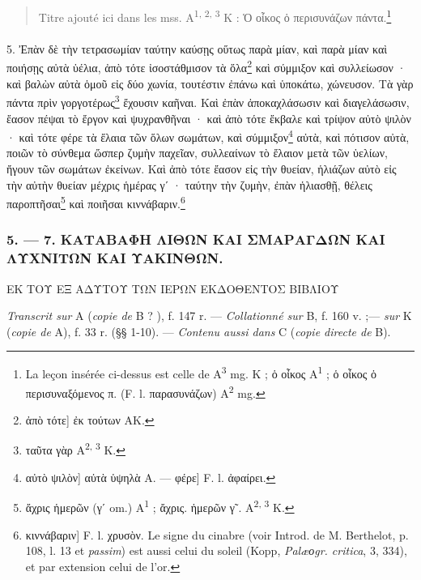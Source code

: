 \documentclass[a4paper, 11pt, oneside, polutonikogreek, french]{article}
\begin{document}
\begin{quotation}
Titre ajouté ici dans les mss. A\textsuperscript{1, 2, 3} K : Ὁ οἶκος ὁ περισυνάζων πάντα.\footnote{La leçon insérée ci-dessus est celle de A\textsuperscript{3} mg. K ; ὁ οἶκος A\textsuperscript{1} ; ὁ οἶκος ὁ περισυναξόμενος π. (F. l. παρασυνάζων) A\textsuperscript{2} mg.}
\end{quotation}
\paragraph{}
5. Ἐπὰν δὲ τὴν τετρασωμίαν ταύτην καύσῃς οὕτως παρὰ μίαν, καὶ παρὰ μίαν καὶ ποιήσῃς αὐτὰ ὑέλια, ἀπὸ τότε ἰσοστάθμισον τὰ ὅλα\footnote{ἀπὸ τότε] ἐκ τούτων AK.} καὶ σύμμιξον καὶ συλλείωσον · καὶ βαλὼν αὐτὰ ὁμοῦ εἰς δύο χωνία, τουτέστιν ἐπάνω καὶ ὑποκάτω, χώνευσον. Τὰ γὰρ πάντα πρὶν γοργοτέρως\footnote{ταῦτα γὰρ A\textsuperscript{2, 3} K.} ἔχουσιν καῆναι. Καὶ ἐπὰν ἀποκαχλάσωσιν καὶ διαγελάσωσιν, ἔασον πέψαι τὸ ἔργον καὶ ψυχρανθῆναι · καὶ ἀπὸ τότε ἔκβαλε καὶ τρίψον αὐτὸ ψιλὸν · καὶ τότε φέρε τὰ ἔλαια τῶν ὅλων σωμάτων, καὶ σύμμιξον\footnote{αὐτὸ ψιλὸν] αὐτὰ ὑψηλὰ A. --- φέρε] F. l. ἀφαίρει.} αὐτὰ, καὶ πότισον αὐτὰ, ποιῶν τὸ σύνθεμα ὥσπερ ζυμὴν παχεῖαν, συλλεαίνων τὸ ἔλαιον μετὰ τῶν ὑελίων, ἤγουν τῶν σωμάτων ἐκείνων. Καὶ ἀπὸ τότε ἔασον εἰς τὴν θυείαν, ἡλιάζων αὐτὸ εἰς τὴν αὐτὴν θυείαν μέχρις ἡμέρας γʹ · ταύτην τὴν ζυμὴν, ἐπὰν ἡλιασθῇ, θέλεις παροπτῆσαι\footnote{ἄχρις ἡμερῶν (γʹ om.) A\textsuperscript{1} ; ἄχρις. ἡμερῶν γ῀. A\textsuperscript{2, 3} K.} καὶ ποιῆσαι κιννάβαριν.\footnote{κιννάβαριν] F. l. χρυσὸν. Le signe du cinabre (voir Introd. de M. Berthelot, p. 108, l. 13 et \emph{passim}) est aussi celui du soleil (Kopp, \emph{Palæοgr. critica}, 3, 334), et par extension celui de l'or.}

\bigskip
\centerline{\EightStarTaper}
\centerline{\EightStarTaper\EightStarTaper}
\bigskip

\subsubsection{5. --- 7. ΚΑΤΑΒΑΦΗ ΛΙΘΩΝ ΚΑΙ ΣΜΑΡΑΓΔΩΝ ΚΑΙ ΛΥΧΝΙΤΩΝ ΚΑΙ ΥΑΚΙΝΘΩΝ.}

ΕΚ ΤΟΥ ΕΞ ΑΔΥΤΟΥ ΤΩΝ ΙΕΡΩΝ ΕΚΔΟΘΕΝΤΟΣ ΒΙΒΛΙΟΥ

\emph{Transcrit sur} A (\emph{copie de} B ? ), f. 147 r. --- \emph{Collationné sur} B, f. 160 v. ;--- \emph{sur} K (\emph{copie de} A), f. 33 r. (§§ 1-10). --- \emph{Contenu aussi dans} C (\emph{copie directe de} B).

\bigskip
\end{document}
